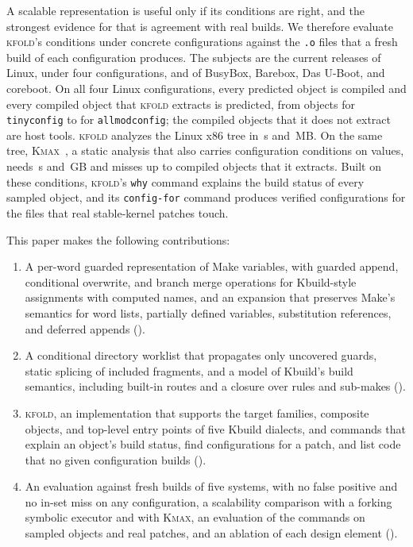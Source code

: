 \documentclass[acmsmall,screen,review]{acmart}
\newcommand{\tool}{\textsc{kfold}\xspace}
\newcommand{\kmax}{\textsc{Kmax}\xspace}
\begin{document}
A scalable representation is useful only if its conditions are right, and the strongest evidence for that is agreement with real builds. We therefore evaluate \tool's conditions under concrete configurations against the \texttt{.o} files that a fresh build of each configuration produces. The subjects are the current releases of Linux, under four configurations, and of BusyBox, Barebox, Das U-Boot, and coreboot. On all four Linux configurations, every predicted object is compiled and every compiled object that \tool extracts is predicted, from \NLinuxTinyconfigTp objects for \texttt{tinyconfig} to \NLinuxAllmodconfigTp for \texttt{allmodconfig}; the compiled objects that it does not extract are host tools. \tool analyzes the Linux x86 tree in \NLinuxSeconds\,s and \NLinuxRss\,MB. On the same tree, \kmax~\cite{gazzillo2017kmax}, a static analysis that also carries configuration conditions on values, needs \NLinuxKmaxSeconds\,s and \NLinuxKmaxRssGb\,GB and misses up to \NLinuxKmaxAllmodconfigWithDirsFn compiled objects that it extracts. Built on these conditions, \tool's \texttt{why} command explains the build status of every sampled object, and its \texttt{config-for} command produces verified configurations for the files that real stable-kernel patches touch.

This paper makes the following contributions:
\begin{enumerate}
\item A per-word guarded representation of Make variables, with guarded append, conditional overwrite, and branch merge operations for Kbuild-style assignments with computed names, and an expansion that preserves Make's semantics for word lists, partially defined variables, substitution references, and deferred appends ().
\item A conditional directory worklist that propagates only uncovered guards, static splicing of included fragments, and a model of Kbuild's build semantics, including built-in routes and a closure over rules and sub-makes ().
\item \tool, an implementation that supports the target families, composite objects, and top-level entry points of five Kbuild dialects, and commands that explain an object's build status, find configurations for a patch, and list code that no given configuration builds ().
\item An evaluation against fresh builds of five systems, with no false positive and no in-set miss on any configuration, a scalability comparison with a forking symbolic executor and with \kmax, an evaluation of the commands on sampled objects and real patches, and an ablation of each design element ().
\end{enumerate}
\end{document}
